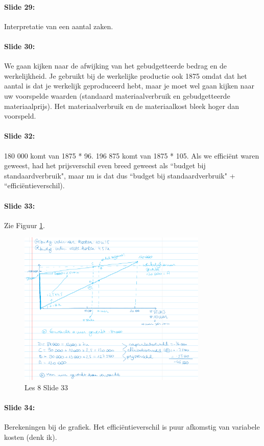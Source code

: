 \documentclass[10pt,a4paper]{report}
\begin{document}
\paragraph{Slide 29:} Interpretatie van een aantal zaken.

\paragraph{Slide 30:} We gaan kijken naar de afwijking van het gebudgetteerde bedrag en de werkelijkheid. Je gebruikt bij de werkelijke productie ook 1875 omdat dat het aantal is dat je werkelijk geproduceerd hebt, maar je moet wel gaan kijken naar uw voorspelde waarden (standaard materiaalverbruik en gebudgetteerde materiaalprijs). Het materiaalverbruik en de materiaalkost bleek hoger dan voorspeld. 

\paragraph{Slide 32:} 180 000 komt van 1875 * 96. 196 875 komt van 1875 * 105. Als we effici\"ent waren geweest, had het prijsverschil even breed geweest als ``budget bij standaardverbruik", maar nu is dat dus ``budget bij standaardverbruik" + ``effici\"entieverschil).

\paragraph{Slide 33:} Zie Figuur \ref{les08_03}.

\begin{figure}[h!]
\centering
\includegraphics[width=90mm]{Les08_03.png}
\caption{Les 8 Slide 33} 
\label{les08_03}
\end{figure}

\paragraph{Slide 34:} Berekeningen bij de grafiek. Het effici\"entieverschil is puur afkomstig van variabele kosten (denk ik).
    
\end{document}
